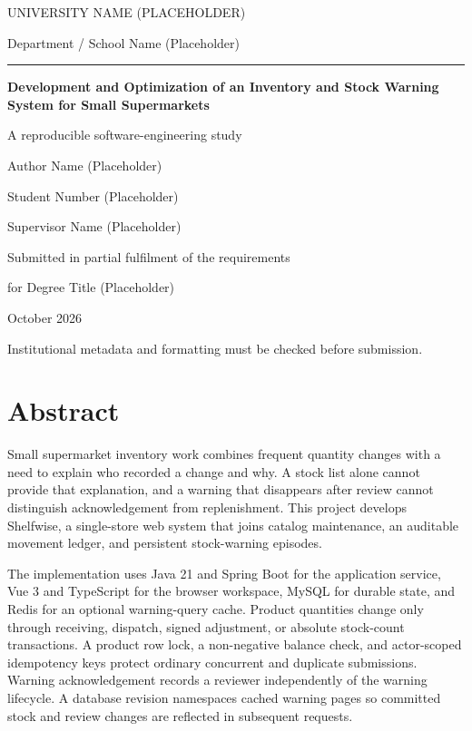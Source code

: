 \documentclass[11pt,a4paper,oneside]{report}
\begin{document}
\begin{titlepage}
\centering
{\small UNIVERSITY NAME (PLACEHOLDER)\par}
{\small Department / School Name (Placeholder)\par}
\vspace{2.1cm}
{\color{accent}\rule{0.23\textwidth}{1.5pt}\par}
\vspace{0.7cm}
{\LARGE\bfseries Development and Optimization of an Inventory and Stock Warning System for Small Supermarkets\par}
\vspace{0.8cm}
{\large A reproducible software-engineering study\par}
\vspace{1.9cm}
{\large Author Name (Placeholder)\par}
{\normalsize Student Number (Placeholder)\par}
\vspace{0.6cm}
{\normalsize Supervisor Name (Placeholder)\par}
\vfill
{\normalsize Submitted in partial fulfilment of the requirements\par}
{\normalsize for Degree Title (Placeholder)\par}
\vspace{0.5cm}
{\normalsize October 2026\par}
\vspace{0.4cm}
{\footnotesize Institutional metadata and formatting must be checked before submission.\par}
\end{titlepage}
\chapter*{Abstract}
Small supermarket inventory work combines frequent quantity changes with a need to explain who recorded a change and why. A stock list alone cannot provide that explanation, and a warning that disappears after review cannot distinguish acknowledgement from replenishment. This project develops Shelfwise, a single-store web system that joins catalog maintenance, an auditable movement ledger, and persistent stock-warning episodes.

The implementation uses Java 21 and Spring Boot for the application service, Vue 3 and TypeScript for the browser workspace, MySQL for durable state, and Redis for an optional warning-query cache. Product quantities change only through receiving, dispatch, signed adjustment, or absolute stock-count transactions. A product row lock, a non-negative balance check, and actor-scoped idempotency keys protect ordinary concurrent and duplicate submissions. Warning acknowledgement records a reviewer independently of the warning lifecycle. A database revision namespaces cached warning pages so committed stock and review changes are reflected in subsequent requests.
\end{document}
